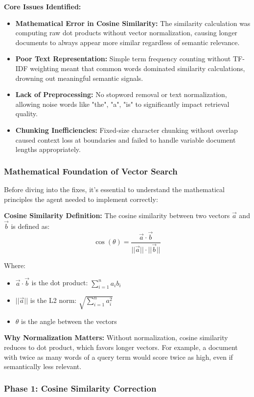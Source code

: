 \documentclass[12pt, a4paper]{article}
\begin{document}
\textbf{Core Issues Identified:}
\begin{itemize}
    \item \textbf{Mathematical Error in Cosine Similarity:} The similarity calculation was computing raw dot products without vector normalization, causing longer documents to always appear more similar regardless of semantic relevance.
    \item \textbf{Poor Text Representation:} Simple term frequency counting without TF-IDF weighting meant that common words dominated similarity calculations, drowning out meaningful semantic signals.
    \item \textbf{Lack of Preprocessing:} No stopword removal or text normalization, allowing noise words like "the", "a", "is" to significantly impact retrieval quality.
    \item \textbf{Chunking Inefficiencies:} Fixed-size character chunking without overlap caused context loss at boundaries and failed to handle variable document lengths appropriately.
\end{itemize}

\subsubsection{Mathematical Foundation of Vector Search}

Before diving into the fixes, it's essential to understand the mathematical principles the agent needed to implement correctly:

\textbf{Cosine Similarity Definition:}
The cosine similarity between two vectors $\vec{a}$ and $\vec{b}$ is defined as:
\[
\cos(\theta) = \frac{\vec{a} \cdot \vec{b}}{||\vec{a}|| \cdot ||\vec{b}||}
\]

Where:
\begin{itemize}
    \item $\vec{a} \cdot \vec{b}$ is the dot product: $\sum_{i=1}^{n} a_i b_i$
    \item $||\vec{a}||$ is the L2 norm: $\sqrt{\sum_{i=1}^{n} a_i^2}$
    \item $\theta$ is the angle between the vectors
\end{itemize}

\textbf{Why Normalization Matters:}
Without normalization, cosine similarity reduces to dot product, which favors longer vectors. For example, a document with twice as many words of a query term would score twice as high, even if semantically less relevant.

\subsubsection{Phase 1: Cosine Similarity Correction}
\end{document}

